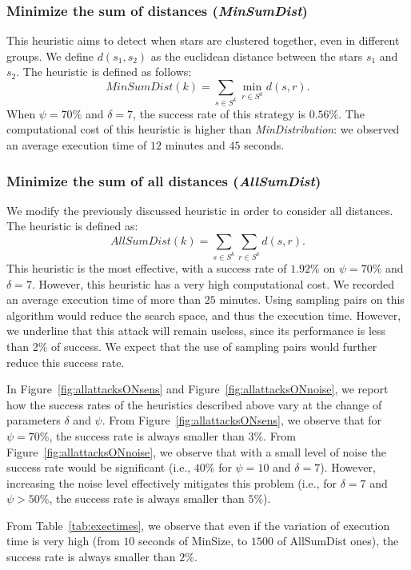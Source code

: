 \documentclass[conference]{IEEEtran}
\newcommand{\hilight}[1]{#1}
\begin{document}
\subsubsection{Minimize the sum of distances (\textit{MinSumDist})}
This heuristic aims to detect when stars are clustered together, even in different groups. We define $d(s_1,s_2)$ as the euclidean distance between the stars $s_1$ and $s_2$.
The heuristic is defined as follows:
$$ {MinSumDist}(k)=\sum_{s\in S^k} \min_{r\in S^k}d(s,r) .$$
When $\psi=70\%$ and $\delta=7$, the success rate of this strategy is $0.56\%$.
The computational cost of this heuristic is higher than \textit{MinDistribution}:
we observed an average execution time of $12$ minutes and $45$ seconds.

\subsubsection{Minimize the sum of all distances (\textit{AllSumDist})}
We modify the previously discussed heuristic in order to consider all distances.
The heuristic is defined as:
$${AllSumDist}(k)=\sum_{s\in S^k} \sum_{r\in S^k} d(s,r).$$
This heuristic is the most effective, with a success rate of $1.92\%$ on $\psi=70\%$ and $\delta=7$.
However, this heuristic has a very high computational cost.
We recorded an average execution time of more than $25$ minutes. \hilight{Using sampling pairs on this algorithm would reduce the search space, and thus the execution time.
However, we underline that this attack will remain useless, since its performance is less than 2\% of success.
We expect that the use of sampling pairs would further reduce this success rate.}



In Figure~\ref{fig:allattacksONsens} and Figure~\ref{fig:allattacksONnoise}, we report how the success rates of the heuristics described above vary at the change of parameters $\delta$ and $\psi$. From Figure~\ref{fig:allattacksONsens}, we observe that for $\psi=70\%$, the success rate is always smaller than $3\%$.
From Figure~\ref{fig:allattacksONnoise}, we observe that with a small level of noise the success rate would be significant (i.e., $40\%$ for $\psi=10$ and $\delta=7$).
However, increasing the noise level effectively mitigates this problem (i.e., for $\delta=7$ and $\psi>50\%$, the success rate is always smaller than $5\%$).

From Table~\ref{tab:exectimes}, we observe that even if the variation of execution time is very high (from $10$ seconds of MinSize, to $1500$ of AllSumDist ones), the success rate is always smaller than $2\%$.
\end{document}
